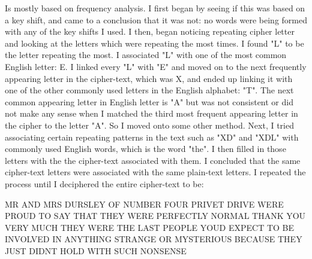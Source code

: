 \documentclass[a4paper,11pt]{article}
\theoremstyle{mytheor}
\begin{document}
\noindent Is mostly based on frequency analysis. I first began by seeing if this was based on a key shift, and came to a conclusion that it was not: no words were being formed with any of the key shifts I used. I then, began noticing repeating cipher letter and looking at the letters which were repeating the most times. I found "L" to be the letter repeating the most. I associated "L" with one of the most common English letter: E. I linked every "L" with "E" and moved on to the next frequently appearing letter in the cipher-text, which was X, and ended up linking it with one of the other commonly used letters in the English alphabet: "T". The next common appearing letter in English letter is "A" but was not consistent or did not make any sense when I matched the third most frequent appearing letter in the cipher to the letter "A". So I moved onto some other method. Next, I tried associating certain repeating patterns in the text such as "XD" and "XDL"  with commonly used English words, which is the word "the". I then filled in those letters with the the cipher-text associated with them. I concluded that the same cipher-text letters were associated with the same plain-text letters. I repeated the process until I deciphered the entire cipher-text to be:
\bigskip

\noindent
MR AND MRS DURSLEY OF NUMBER FOUR PRIVET DRIVE WERE PROUD TO SAY THAT THEY WERE PERFECTLY NORMAL THANK YOU VERY MUCH THEY WERE THE LAST PEOPLE YOUD EXPECT TO BE INVOLVED IN ANYTHING STRANGE OR MYSTERIOUS BECAUSE THEY JUST DIDNT HOLD WITH SUCH NONSENSE
\end{document}
